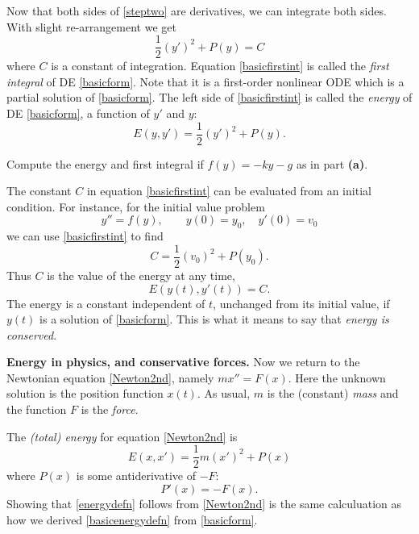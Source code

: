 \documentclass[12pt]{article}
\theoremstyle{definition}
\begin{document}
Now that both sides of \eqref{steptwo} are derivatives, we can integrate both sides.  With slight re-arrangement we get
\begin{equation}
  \frac{1}{2} (y')^2 + P(y) = C  \label{basicfirstint}
\end{equation}
where $C$ is a constant of integration.  Equation \eqref{basicfirstint} is called the \emph{first integral} of DE \eqref{basicform}.  Note that it is a first-order nonlinear ODE which is a partial solution of \eqref{basicform}.  The left side of \eqref{basicfirstint} is called the \emph{energy} of DE \eqref{basicform}, a function of $y'$ and $y$:
\begin{equation}
  E(y,y') = \frac{1}{2} (y')^2 + P(y).  \label{basicenergydefn}
\end{equation}

\begin{exerpart}
Compute the energy and first integral if $f(y)=-ky-g$ as in part \textbf{(a)}.
\end{exerpart}

The constant $C$ in equation \eqref{basicfirstint} can be evaluated from an initial condition.  For instance, for the initial value problem
    $$y''=f(y), \qquad y(0)=y_0, \quad y'(0)=v_0$$
we can use \eqref{basicfirstint} to find
    $$C = \frac{1}{2} (v_0)^2 + P(y_0).$$
Thus $C$ is the value of the energy at any time,
    $$E(y(t),y'(t)) = C.$$
The energy is a constant independent of $t$, unchanged from its initial value, if $y(t)$ is a solution of \eqref{basicform}.  This is what it means to say that \emph{energy is conserved}.

\medskip
\textbf{Energy in physics, and conservative forces.}  Now we return to the Newtonian equation \eqref{Newton2nd}, namely $m x'' = F(x)$.  Here the unknown solution is the position function $x(t)$.  As usual, $m$ is the (constant) \emph{mass} and the function $F$ is the \emph{force}.

The \emph{(total) energy} for equation \eqref{Newton2nd} is
\begin{equation}
  E(x,x') = \frac{1}{2} m (x')^2 + P(x)  \label{energydefn}
\end{equation}
where $P(x)$ is some antiderivative of $-F$:
\begin{equation}
P'(x)=-F(x).  \label{potentialfunction}
\end{equation}
Showing that \eqref{energydefn} follows from \eqref{Newton2nd} is the same calculuation as how we derived \eqref{basicenergydefn} from \eqref{basicform}.
\end{document}
